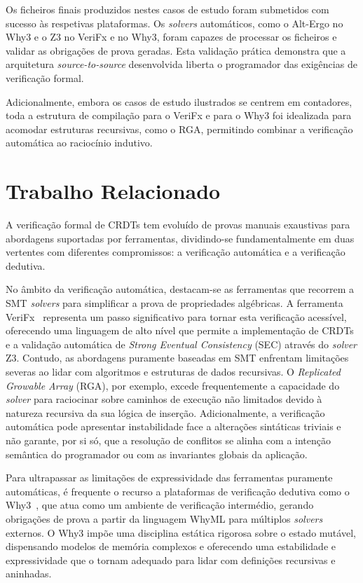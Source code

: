\documentclass{llncs}
\begin{document}
Os ficheiros finais produzidos nestes casos de estudo foram submetidos com sucesso às respetivas plataformas.
Os \textit{solvers} automáticos, como o Alt-Ergo no Why3 e o Z3 no VeriFx e no Why3, foram capazes de processar os ficheiros e validar as obrigações de prova geradas.
Esta validação prática demonstra que a arquitetura \textit{source-to-source} desenvolvida liberta o programador das exigências de verificação formal.

Adicionalmente, embora os casos de estudo ilustrados se centrem em contadores, toda a estrutura de compilação para o VeriFx e
para o Why3 foi idealizada para acomodar estruturas recursivas, como o RGA,
permitindo combinar a verificação automática ao raciocínio indutivo.

\section{Trabalho Relacionado}

A verificação formal de CRDTs tem evoluído de provas manuais exaustivas para abordagens suportadas por ferramentas,
dividindo-se fundamentalmente em duas vertentes com diferentes compromissos: a verificação automática e a verificação dedutiva.

No âmbito da verificação automática, destacam-se as ferramentas que recorrem a SMT \textit{solvers} para simplificar a prova de propriedades algébricas.
A ferramenta VeriFx~\cite{porre2023masses} representa um passo significativo para tornar esta verificação acessível,
oferecendo uma linguagem de alto nível que permite a implementação de CRDTs e a validação automática de
\textit{Strong Eventual Consistency} (SEC) através do \textit{solver} Z3. Contudo, as abordagens puramente baseadas em SMT enfrentam limitações
severas ao lidar com algoritmos e estruturas de dados recursivas. O \textit{Replicated Growable Array} (RGA),
por exemplo, excede frequentemente a capacidade do \textit{solver} para raciocinar sobre caminhos de execução não limitados devido
à natureza recursiva da sua lógica de inserção. Adicionalmente, a verificação automática pode apresentar instabilidade
face a alterações sintáticas triviais e não garante, por si só, que a resolução de conflitos se alinha com a intenção semântica
do programador ou com as invariantes globais da aplicação.

Para ultrapassar as limitações de expressividade das ferramentas puramente automáticas,
é frequente o recurso a plataformas de verificação dedutiva como o Why3~\cite{why3},
que atua como um ambiente de verificação intermédio, gerando obrigações de prova a partir da linguagem WhyML
para múltiplos \textit{solvers} externos. O Why3 impõe uma disciplina estática rigorosa sobre o estado mutável,
dispensando modelos de memória complexos e oferecendo uma estabilidade e expressividade que o tornam adequado
para lidar com definições recursivas e aninhadas.
\end{document}
